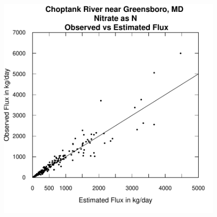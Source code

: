 \documentclass[a4paper,11pt]{article}
\begin{document}
\begin{figure}[htbp]
  \begin{minipage}[h]{0.5\linewidth}
    \begin{center}

\includegraphics{EGRET-figplotFluxPred}
    \label{fig:plotFluxPred}
    \end{center}
  \end{minipage}
  \begin{minipage}[h]{0.5\linewidth}
    \begin{center}



\end{center}
\end{minipage}
\end{figure}
\end{document}
